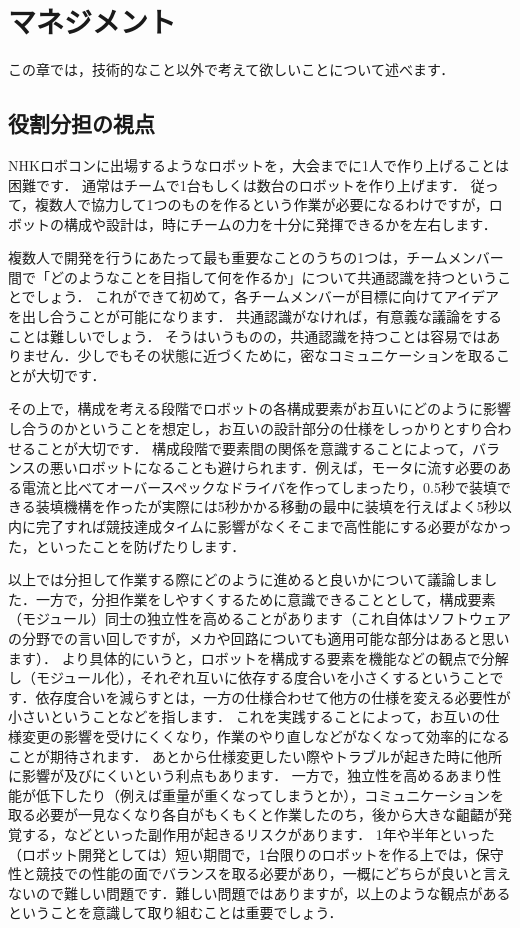 \chapter{マネジメント}

この章では，技術的なこと以外で考えて欲しいことについて述べます．

\section{役割分担の視点}

NHKロボコンに出場するようなロボットを，大会までに1人で作り上げることは困難です．
通常はチームで1台もしくは数台のロボットを作り上げます．
従って，複数人で協力して1つのものを作るという作業が必要になるわけですが，ロボットの構成や設計は，時にチームの力を十分に発揮できるかを左右します．

複数人で開発を行うにあたって最も重要なことのうちの1つは，チームメンバー間で「どのようなことを目指して何を作るか」について共通認識を持つということでしょう．
これができて初めて，各チームメンバーが目標に向けてアイデアを出し合うことが可能になります．
共通認識がなければ，有意義な議論をすることは難しいでしょう．
そうはいうものの，共通認識を持つことは容易ではありません．少しでもその状態に近づくために，密なコミュニケーションを取ることが大切です．

その上で，構成を考える段階でロボットの各構成要素がお互いにどのように影響し合うのかということを想定し，お互いの設計部分の仕様をしっかりとすり合わせることが大切です．
構成段階で要素間の関係を意識することによって，バランスの悪いロボットになることも避けられます．例えば，モータに流す必要のある電流と比べてオーバースペックなドライバを作ってしまったり，0.5秒で装填できる装填機構を作ったが実際には5秒かかる移動の最中に装填を行えばよく5秒以内に完了すれば競技達成タイムに影響がなくそこまで高性能にする必要がなかった，といったことを防げたりします．

以上では分担して作業する際にどのように進めると良いかについて議論しました．一方で，分担作業をしやすくするために意識できることとして，構成要素（モジュール）同士の独立性を高めることがあります（これ自体はソフトウェアの分野での言い回しですが，メカや回路についても適用可能な部分はあると思います）．
より具体的にいうと，ロボットを構成する要素を機能などの観点で分解し（モジュール化），それぞれ互いに依存する度合いを小さくするということです．依存度合いを減らすとは，一方の仕様合わせて他方の仕様を変える必要性が小さいということなどを指します．
これを実践することによって，お互いの仕様変更の影響を受けにくくなり，作業のやり直しなどがなくなって効率的になることが期待されます．
あとから仕様変更したい際やトラブルが起きた時に他所に影響が及びにくいという利点もあります．
一方で，独立性を高めるあまり性能が低下したり（例えば重量が重くなってしまうとか），コミュニケーションを取る必要が一見なくなり各自がもくもくと作業したのち，後から大きな齟齬が発覚する，などといった副作用が起きるリスクがあります．
1年や半年といった（ロボット開発としては）短い期間で，1台限りのロボットを作る上では，保守性と競技での性能の面でバランスを取る必要があり，一概にどちらが良いと言えないので難しい問題です．難しい問題ではありますが，以上のような観点があるということを意識して取り組むことは重要でしょう．


